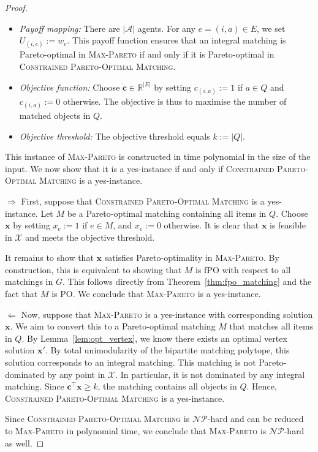 \documentclass[10pt,a4paper]{amsart}
\newcommand{\mbb}{\mathbb}
\newcommand{\mc}{\mathcal}
\begin{document}
\begin{proof}
\begin{itemize}
    \item \textit{Payoff mapping:} There are $|\mc{A}|$ agents. For any $e = (i, a) \in E$, we set $U_{(i, e)} := w_e$. This payoff function ensures that an integral matching is Pareto-optimal in \textsc{Max-Pareto} if and only if it is Pareto-optimal in \textsc{Constrained Pareto-Optimal Matching}.
    \item \textit{Objective function:} Choose $\bm{c} \in \mbb{R}^{|E|}$ by setting $c_{(i, a)} := 1$ if $a \in Q$ and $c_{(i, a)} := 0$ otherwise. The objective is thus to maximise the number of matched objects in $Q$.
    \item \textit{Objective threshold:} The objective threshold equals $k := |Q|$.
\end{itemize} 
This instance of \textsc{Max-Pareto} is constructed in time polynomial in the size of the input. We now show that it is a yes-instance if and only if \textsc{Constrained Pareto-Optimal Matching} is a yes-instance.

$\Rightarrow$ First, suppose that \textsc{Constrained Pareto-Optimal Matching} is a yes-instance. Let $M$ be a Pareto-optimal matching containing all items in $Q$. Choose $\bm{x}$ by setting $x_{e} := 1$ if $e \in M$, and $x_e := 0$ otherwise. It is clear that $\bm{x}$ is feasible in $\mc{X}$ and meets the objective threshold. 

It remains to show that $\bm{x}$ satisfies Pareto-optimality in \textsc{Max-Pareto}. By construction, this is equivalent to showing that $M$ is fPO with respect to all matchings in $G$. This follows directly from Theorem~\ref{thm:fpo_matching} and the fact that $M$ is PO. We conclude that \textsc{Max-Pareto} is a yes-instance.

$\Leftarrow$ Now, suppose that \textsc{Max-Pareto} is a yes-instance with corresponding solution $\bm{x}$. We aim to convert this to a Pareto-optimal matching $M$ that matches all items in $Q$. By Lemma~\ref{lem:opt_vertex}, we know there exists an optimal vertex solution $\bm{x}'$. By total unimodularity of the bipartite matching polytope, this solution corresponds to an integral matching. This matching is not Pareto-dominated by any point in $\mc{X}$. In particular, it is not dominated by any integral matching. Since $\bm{c}^\top \bm{x} \geq k$, the matching contains all objects in $Q$. Hence, \textsc{Constrained Pareto-Optimal Matching} is a yes-instance.  

Since \textsc{Constrained Pareto-Optimal Matching} is $\mc{NP}$-hard and can be reduced to \textsc{Max-Pareto} in polynomial time, we conclude that \textsc{Max-Pareto} is $\mc{NP}$-hard as well.
\end{proof}
\end{document}
